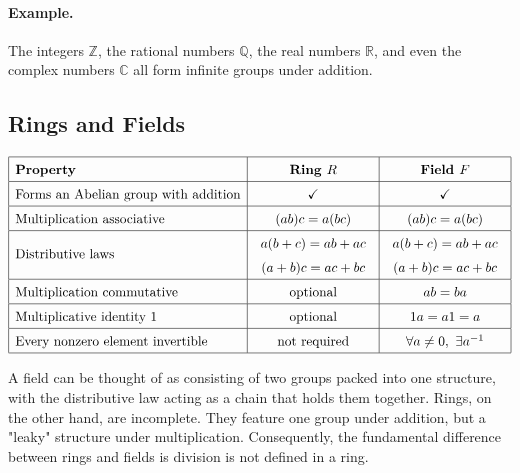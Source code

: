 \paragraph{Example.}
The integers $\mathbb{Z}$, the rational numbers $\mathbb{Q}$, the real numbers $\mathbb{R}$, and even the complex numbers $\mathbb{C}$ all form infinite groups under addition.


\subsection{Rings and Fields}

\[
\renewcommand{\arraystretch}{1.5}
\begin{array}{|l|c|c|}
\hline
\textbf{Property} & \textbf{Ring } R & \textbf{Field } F \\
\hline

\text{Forms an Abelian group with addition} & \checkmark & \checkmark \\
\hline

\text{Multiplication associative} &
(ab)c=a(bc) &
(ab)c=a(bc) \\
\hline

\text{Distributive laws} &
\begin{array}{c}
a(b+c)=ab+ac \\
(a+b)c=ac+bc
\end{array}
&
\begin{array}{c}
a(b+c)=ab+ac \\
(a+b)c=ac+bc
\end{array}
\\
\hline

\text{Multiplication commutative} &
\text{optional} &
ab=ba \\
\hline

\text{Multiplicative identity } 1 &
\text{optional} &
1a=a1=a \\
\hline

\text{Every nonzero element invertible} &
\text{not required} &
\forall a\neq 0,\ \exists a^{-1}
\\
\hline

\end{array}
\]

A field can be thought of as consisting of two groups packed into one structure, with the distributive law acting as a chain that holds them together. Rings, on the other hand, are incomplete. They feature one group under addition, but a "leaky" structure under multiplication. Consequently, the fundamental difference between rings and fields is division is not defined in a ring.

